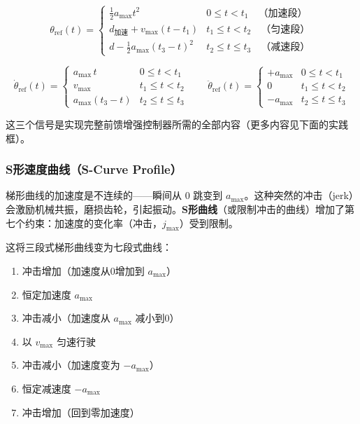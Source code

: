 \begin{equation}
\theta_{\text{ref}}(t) = \begin{cases}
\tfrac{1}{2}a_{\max}t^2 & 0 \le t < t_1 \quad \text{（加速段）}\\[4pt]
d_{\text{加速}} + v_{\max}(t - t_1) & t_1 \le t < t_2 \quad \text{（匀速段）}\\[4pt]
d - \tfrac{1}{2}a_{\max}(t_3-t)^2 & t_2 \le t \le t_3 \quad \text{（减速段）}
\end{cases}
\end{equation}

\begin{equation}
\dot{\theta}_{\text{ref}}(t) = \begin{cases}
a_{\max}\,t & 0 \le t < t_1 \\
v_{\max} & t_1 \le t < t_2 \\
a_{\max}(t_3 - t) & t_2 \le t \le t_3
\end{cases}
\qquad
\ddot{\theta}_{\text{ref}}(t) = \begin{cases}
+a_{\max} & 0 \le t < t_1 \\
0 & t_1 \le t < t_2 \\
-a_{\max} & t_2 \le t \le t_3
\end{cases}
\end{equation}

这三个信号是实现完整前馈增强控制器所需的全部内容（更多内容见下面的实践框）。

\subsubsection{S形速度曲线（S-Curve Profile）}

梯形曲线的加速度是不连续的——瞬间从 $0$ 跳变到 $a_{\max}$。这种突然的冲击（jerk）会激励机械共振，磨损齿轮，引起振动。\textbf{S形曲线}（或限制冲击的曲线）增加了第七个约束：加速度的变化率（冲击，$j_{\max}$）受到限制。

这将三段式梯形曲线变为七段式曲线：
\begin{enumerate}[nosep]
    \item 冲击增加（加速度从0增加到 $a_{\max}$）
    \item 恒定加速度 $a_{\max}$
    \item 冲击减小（加速度从 $a_{\max}$ 减小到0）
    \item 以 $v_{\max}$ 匀速行驶
    \item 冲击减小（加速度变为 $-a_{\max}$）
    \item 恒定减速度 $-a_{\max}$
    \item 冲击增加（回到零加速度）
\end{enumerate}

